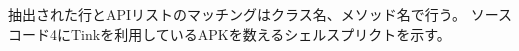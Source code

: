 抽出された行とAPIリストのマッチングはクラス名、メソッド名で行う。
ソースコード4にTinkを利用しているAPKを数えるシェルスプリクトを示す。%



































